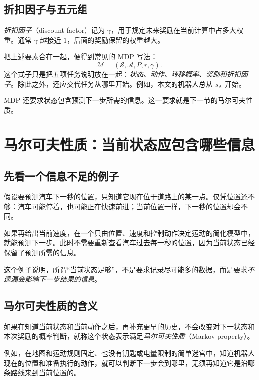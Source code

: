 \documentclass[UTF8,12pt,a4paper,fontset=fandol]{ctexart}
\begin{document}
\subsection{折扣因子与五元组}

\emph{折扣因子}（discount factor）记为 $\gamma$，用于规定未来奖励在当前计算中占多大权重。通常 $\gamma$ 越接近 $1$，后面的奖励保留的权重越大。

把上述要素合在一起，便得到常见的 MDP 写法：
\begin{equation}
  \mathcal M=(\mathcal S,\mathcal A,P,r,\gamma).
  \label{eq:mdp-tuple}
\end{equation}
这个式子只是把五项任务说明放在一起：\emph{状态、动作、转移概率、奖励和折扣因子}。除此之外，还应交代任务从哪里开始。例如，本文的机器人总从 $s_{\mathrm A}$ 开始。

MDP 还要求状态包含预测下一步所需的信息。这一要求就是下一节的马尔可夫性质。

\section{马尔可夫性质：当前状态应包含哪些信息}
\label{sec:mdp-markov}

\subsection{先看一个信息不足的例子}

假设要预测汽车下一秒的位置，只知道它现在位于道路上的某一点。仅凭位置还不够：汽车可能停着，也可能正在快速前进；当前位置一样，下一秒的位置却会不同。

如果再给出当前速度，在一个只由位置、速度和控制动作决定运动的简化模型中，就能预测下一步。此时不需要重新查看汽车过去每一秒的位置，因为当前状态已经保留了预测所需的信息。

这个例子说明，所谓“当前状态足够”，不是要求记录尽可能多的数据，而是要求\emph{不遗漏会影响下一步结果的信息}。

\subsection{马尔可夫性质的含义}

\begin{definition}[马尔可夫性质]
如果在知道当前状态和当前动作之后，再补充更早的历史，不会改变对下一状态和本次奖励的概率判断，就称这个状态表示满足\emph{马尔可夫性质}（Markov property）。
\end{definition}

例如，在地图和运动规则固定、也没有钥匙或电量限制的简单迷宫中，知道机器人现在的位置和准备执行的动作，就可以判断下一步会到哪里，无须再知道它是沿哪条路线来到当前位置的。
\end{document}
